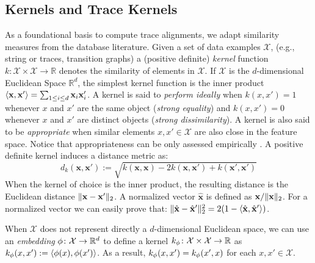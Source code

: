 \subsection{Kernels and Trace Kernels}\label{subsec:katk}
As a foundational basis to compute trace alignments, we adapt similarity measures from the database literature.  Given a set of data examples $\mathcal{X}$, (e.g., string or traces, transition graphs) a (positive definite) \emph{kernel} function $k\colon \mathcal{X}\times \mathcal{X}\to \mathbb{R}$ denotes the similarity of elements in $\mathcal{X}$. If $\mathcal{X}$ is the $d$-dimensional Euclidean Space $\mathbb{R}^d$, the simplest kernel function is the inner product $\Braket{\mathbf{x},\mathbf{x}'}=\sum_{1\leq i\leq d}\mathbf{x}_i\mathbf{x}'_i$.
A kernel is said to \emph{perform ideally} \cite{Gartner03} when $k(x,x')=1$ whenever $x$ and $x'$ are the same object (\textit{strong equality}) and $k(x,x')=0$ whenever $x$ and $x'$ are distinct objects (\textit{strong dissimilarity}). A kernel is also said to be \emph{appropriate} when similar elements $x,x'\in\mathcal{X}$ are also close in the feature space. Notice that appropriateness can be only assessed  empirically \cite{Gartner03}.
A positive definite kernel induces a distance metric as:
\begin{equation}\label{eq:dofk}
d_k(\mathbf{x},\mathbf{x}'):=\sqrt{k(\mathbf{x},\mathbf{x})-2k(\mathbf{x},\mathbf{x}')+k(\mathbf{x}',\mathbf{x}')}
\end{equation}
When the kernel of choice is the inner product, the resulting distance is the Euclidean distance $\|\mathbf{x}-\mathbf{x}'\|_{2}$. A normalized vector $\hat{\mathbf{x}}$ is defined as $\mathbf{x}/\|\mathbf{x}\|_{2}$. For a normalized vector we can easily prove that: $\|\hat{\mathbf{x}}-\hat{\mathbf{x}}'\|_{2}^2=2(1-\Braket{\hat{\mathbf{x}},\hat{\mathbf{x}}'})$.

When $\mathcal{X}$ does not represent directly a $d$-dimensional Euclidean space, we can use an \emph{embedding} $\phi\colon\mathcal{X}\to \mathbb{R}^d$ to define a kernel $k_\phi\colon \mathcal{X}\times \mathcal{X}\to\mathbb{R}$ as $k_\phi(x,x'):=\Braket{\phi(x),\phi(x')}$. As a result, $k_\phi(x,x')=k_\phi(x',x)$ for each $x,x'\in\mathcal{X}$.

